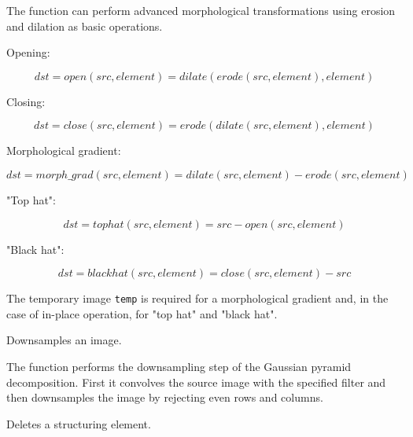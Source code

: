 The function can perform advanced morphological transformations using erosion and dilation as basic operations.

Opening:

\[
dst=open(src,element)=dilate(erode(src,element),element)
\]

Closing:

\[
dst=close(src,element)=erode(dilate(src,element),element)
\]

Morphological gradient:

\[
dst=morph\_grad(src,element)=dilate(src,element)-erode(src,element)
\]

"Top hat":

\[
dst=tophat(src,element)=src-open(src,element)
\]

"Black hat":

\[
dst=blackhat(src,element)=close(src,element)-src
\]

The temporary image \texttt{temp} is required for a morphological gradient and, in the case of in-place operation, for "top hat" and "black hat".

Downsamples an image.


\begin{description}
\end{description}

The function performs the downsampling step of the Gaussian pyramid decomposition. First it convolves the source image with the specified filter and then downsamples the image by rejecting even rows and columns.

\ifC
{}
Deletes a structuring element.


\begin{description}
\end{description}

